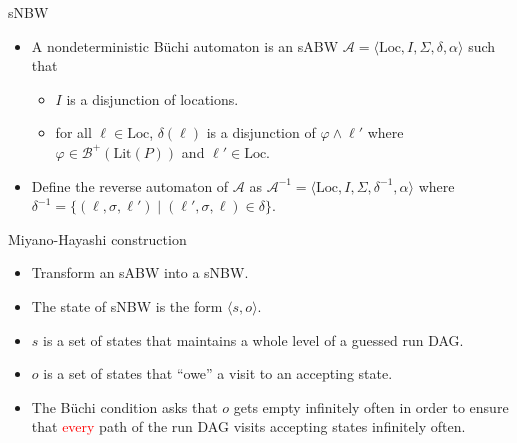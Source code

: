 \documentclass[12pt]{beamer}
\begin{document}
\begin{frame}{sNBW}
	\begin{itemize}
		\item A nondeterministic Büchi automaton is an sABW $\mathcal{A} = \langle \text{Loc}, I, \Sigma, \delta, \alpha \rangle$ such that
		\begin{itemize}
			\item $I$ is a disjunction of locations.
			\item for all $\ell \in \text{Loc}$, $\delta(\ell)$ is a disjunction of $\varphi \land \ell'$ where $\varphi \in \mathcal{B}^{+}(\text{Lit}(P))$ and $ \ell' \in \text{Loc}$.
		\end{itemize}
		\item Define the reverse automaton of $\mathcal{A}$ as $\mathcal{A}^{-1} = \langle \text{Loc}, I, \Sigma, \delta^{-1}, \alpha \rangle$ where $\delta^{-1} = \{(\ell, \sigma, \ell') \mid (\ell', \sigma, \ell) \in \delta\}$.
	\end{itemize}
\end{frame}

\begin{frame}{Miyano-Hayashi construction}
	\begin{itemize}
		\item Transform an sABW into a sNBW.
		\item The state of sNBW is the form $\langle s, o \rangle$.
		\item $s$ is a set of states that maintains a whole level of a guessed run DAG.
		\item $o$ is a set of states that ``owe'' a visit to an accepting state.
		\item  The Büchi condition asks that $o$ gets empty infinitely often in order to ensure that \textcolor{red}{every} path of the run DAG visits accepting states infinitely often.
	\end{itemize}
\end{frame}
\end{document}
